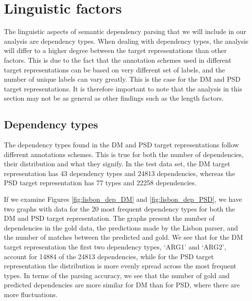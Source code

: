 







\section{Linguistic factors}

The linguistic aspects of semantic dependency parsing that we will include in our analysis are dependency types. When dealing with dependency types, the analysis will differ to a higher degree between the target representations than other factors. This is due to the fact that the annotation schemes used in different target representations can be based on very different set of labels, and the number of unique labels can vary greatly. This is the case for the DM and PSD target representations. It is therefore important to note that the analysis in this section may not be as general as other findings such as the length factors.

\subsection{Dependency types}

The dependency types found in the DM and PSD target representations follow different annotations schemes. This is true for both the number of dependencies, their distribution and what they signify. In the test data set, the DM target representation has 43 dependency types and 24813 dependencies, whereas the PSD target representation has 77 types and 22258 dependencies.

If we examine Figures \ref{fig:lisbon_dep_DM} and \ref{fig:lisbon_dep_PSD}, we have two graphs with data for the 20 most frequent dependency types for both the DM and PSD target representation. The graphs present the number of dependencies in the gold data, the predictions made by the Lisbon parser, and the number of matches between the predicted and gold. We see that for the DM target representation the first two dependency types, `ARG1' and `ARG2', account for 14884 of the 24813 dependencies, while for the PSD target representation the distribution is more evenly spread across the most frequent types. In terms of the parsing accuracy, we see that the number of gold and predicted dependencies are more similar for DM than for PSD, where there are more fluctuations.

